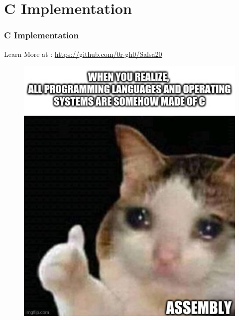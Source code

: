 \section{C Implementation}

\begin{frame}
\frametitle{C Implementation}
\centering
\small{Learn More at : \url{https://github.com/0r-gh0/Salsa20}}
\begin{figure}
    \centering
    \includegraphics[scale=0.32]{cat_meme.jpg}
\end{figure}

\end{frame}